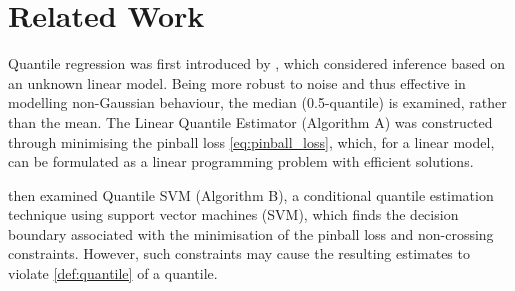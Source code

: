 \documentclass[twoside]{article} \usepackage{aistats2017}
\theoremstyle{definition}
\theoremstyle{theorem}
\begin{document}
\section{Related Work}
\label{sec:related_work}

	Quantile regression was first introduced by \cite{koenker1978regression}, which considered inference based on an unknown linear model. Being more robust to noise and thus effective in modelling non-Gaussian behaviour, the median (0.5-quantile) is examined, rather than the mean. The Linear Quantile Estimator (Algorithm A) was constructed through minimising the pinball loss \eqref{eq:pinball_loss}, which, for a linear model, can be formulated as a linear programming problem with efficient solutions.
	
%	
%	
%	
%	
	\cite{takeuchi2006nonparametric} then examined Quantile SVM (Algorithm B), a conditional quantile estimation technique using support vector machines (SVM), which finds the decision boundary associated with the minimisation of the pinball loss and non-crossing constraints. However, such constraints may cause the resulting estimates to violate \cref{def:quantile} of a quantile.
%	
%	
\end{document}
